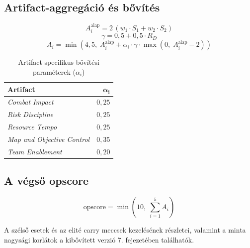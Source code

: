 \subsection{Artifact-aggregáció és bővítés}

\begin{equation}
A_i^{\text{alap}} = 2\,(w_1 \cdot S_1 + w_2 \cdot S_2)
\end{equation}
\begin{equation}
\gamma = 0{,}5 + 0{,}5 \cdot R_D
\end{equation}
\begin{equation}
A_i = \min\!\left(4{,}5,\; A_i^{\text{alap}} + \alpha_i \cdot \gamma \cdot \max\!\left(0,\; A_i^{\text{alap}} - 2\right)\right)
\end{equation}

\begin{table}[H]
\centering
\caption{Artifact-specifikus bővítési paraméterek ($\alpha_i$)}
\label{tab:overflow_params}
\begin{tabular}{lr}
\toprule
\textbf{Artifact} & $\boldsymbol{\alpha_i}$ \\
\midrule
\textit{Combat Impact}             & $0{,}25$ \\
\textit{Risk Discipline}           & $0{,}25$ \\
\textit{Resource Tempo}            & $0{,}25$ \\
\textit{Map and Objective Control} & $0{,}35$ \\
\textit{Team Enablement}           & $0{,}20$ \\
\bottomrule
\end{tabular}
\end{table}

\subsection{A végső opscore}

\begin{equation}
\text{opscore} = \min\!\left(10,\; \sum_{i=1}^{5} A_i\right)
\end{equation}

A szélső esetek és az elité carry meccsek kezelésének részletei, valamint a minta nagysági korlátok a kibővített verzió 7. fejezetében találhatók.
